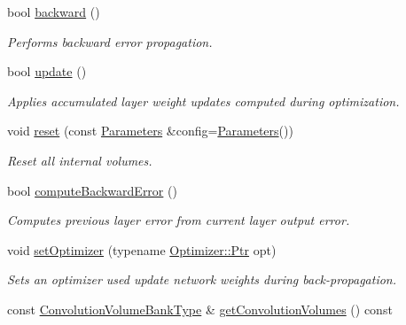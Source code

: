 \begin{DoxyCompactItemize}
bool \hyperlink{classffnn_1_1layer_1_1_convolution_ab3b7e1b317090930a52712723cd822aa}{backward} ()
\begin{DoxyCompactList}\small\item\em Performs backward error propagation. \end{DoxyCompactList}\item 
bool \hyperlink{classffnn_1_1layer_1_1_convolution_aa56059e379a152efee3de409a217d1e1}{update} ()
\begin{DoxyCompactList}\small\item\em Applies accumulated layer weight updates computed during optimization. \end{DoxyCompactList}\item 
void \hyperlink{classffnn_1_1layer_1_1_convolution_aba90ab5ad018485361b1723e29d01354}{reset} (const \hyperlink{classffnn_1_1layer_1_1_convolution_afba43aa5946f49d3ffc306972ba11fff}{Parameters} \&config=\hyperlink{classffnn_1_1layer_1_1_convolution_afba43aa5946f49d3ffc306972ba11fff}{Parameters}())
\begin{DoxyCompactList}\small\item\em Reset all internal volumes. \end{DoxyCompactList}\item 
bool \hyperlink{classffnn_1_1layer_1_1_convolution_ad92e24a7f8c1cc5751496d2cab4b496a}{compute\-Backward\-Error} ()
\begin{DoxyCompactList}\small\item\em Computes previous layer error from current layer output error. \end{DoxyCompactList}\item 
void \hyperlink{classffnn_1_1layer_1_1_convolution_ad0a93e921cb0efcb75b057d2f72ae5de}{set\-Optimizer} (typename \hyperlink{classffnn_1_1optimizer_1_1_optimizer_ac03e7181934bf0c12a97fc67a60484ab}{Optimizer\-::\-Ptr} opt)
\begin{DoxyCompactList}\small\item\em Sets an optimizer used update network weights during back-\/propagation. \end{DoxyCompactList}\item 
const \hyperlink{classffnn_1_1layer_1_1_convolution_a9cec43e24f084c141c0cc8ae3c046ff4}{Convolution\-Volume\-Bank\-Type} \& \hyperlink{classffnn_1_1layer_1_1_convolution_ab7cd47d35f92a5dbc439a33a9af8ce97}{get\-Convolution\-Volumes} () const 
\end{DoxyCompactItemize}
